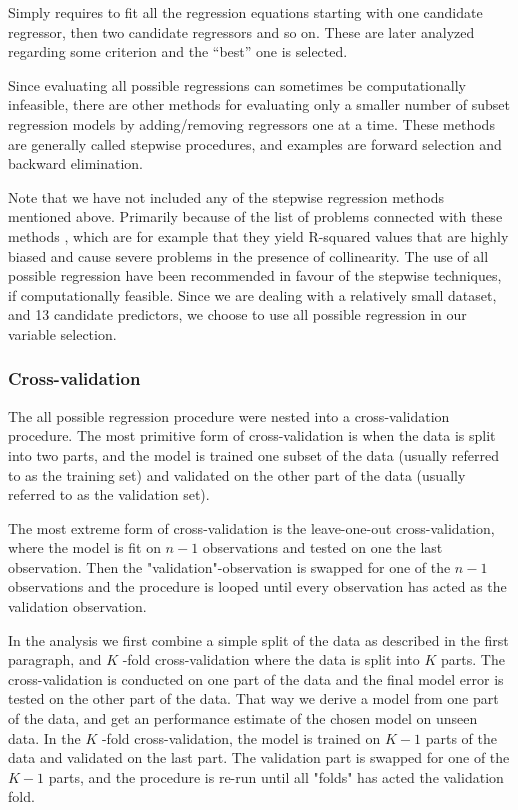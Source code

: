 \documentclass[11pt]{article}
\begin{document}
Simply requires to fit all the regression equations starting with one candidate regressor, then two
candidate regressors and so on. These are later analyzed regarding some criterion and the “best” one is selected. 

Since evaluating all possible regressions can sometimes be computationally infeasible, there are other
methods for evaluating only a smaller number of subset regression models by adding/removing regressors one
at a time. These methods are generally called stepwise procedures, and examples are forward selection and backward
elimination. 

Note that we have not included any of the stepwise regression methods mentioned above. Primarily
because of the list of problems connected with these methods \cite{20856}, which are for example that they yield
R-squared values that are highly biased and cause severe problems in the presence of collinearity. 
The use of all possible regression have been recommended in favour of the stepwise techniques, if 
computationally feasible. \cite{Montgomery2012} Since we are dealing with a relatively small dataset, 
and 13 candidate predictors, we choose to use all possible regression in our variable selection.

\subsubsection{Cross-validation}
\label{sec:org93bb3e9}

The all possible regression procedure were nested into a cross-validation procedure. The most 
primitive form of cross-validation is when the data is split into two parts, and the model
is trained one subset of the data (usually referred to as the training set) and validated 
on the other part of the data (usually referred to as the validation set).

The most extreme form of cross-validation is the leave-one-out cross-validation, where the model 
is fit on \(n - 1\) observations and tested on one the last observation. Then the "validation"-observation 
is swapped for one of the \(n - 1\) observations and the procedure is looped until every observation has acted 
as the validation observation.

In the analysis we first combine a simple split of the data as described in the first paragraph, and 
\(K\) -fold cross-validation where the data is split into \(K\) parts. The cross-validation is conducted on
one part of the data and the final model error is tested on the other 
part of the data. That way we derive a model from one part of the data, and get an performance 
estimate of the chosen model on unseen data. In the \(K\) -fold cross-validation, the model is trained
on \(K - 1\) parts of the data and validated on the last part. The validation part is swapped for one of
the \(K - 1\) parts, and the procedure is re-run until all "folds" has acted the validation fold.
\end{document}
